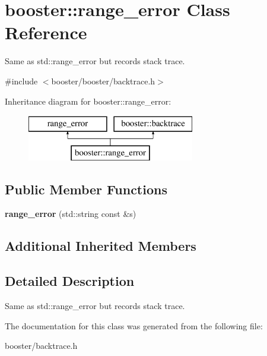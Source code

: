 \section{booster\+:\+:range\+\_\+error Class Reference}
\label{classbooster_1_1range__error}


Same as std\+::range\+\_\+error but records stack trace.  




{\ttfamily \#include $<$booster/booster/backtrace.\+h$>$}

Inheritance diagram for booster\+:\+:range\+\_\+error\+:\begin{figure}[H]
\begin{center}
\leavevmode
\includegraphics[height=2.000000cm]{classbooster_1_1range__error}
\end{center}
\end{figure}
\subsection*{Public Member Functions}
\begin{DoxyCompactItemize}
\item 
{\bfseries range\+\_\+error} (std\+::string const \&s)\label{classbooster_1_1range__error_afaeb47be39652f3ca5d0143b8d4721f1}

\end{DoxyCompactItemize}
\subsection*{Additional Inherited Members}


\subsection{Detailed Description}
Same as std\+::range\+\_\+error but records stack trace. 

The documentation for this class was generated from the following file\+:\begin{DoxyCompactItemize}
\item 
booster/backtrace.\+h\end{DoxyCompactItemize}
